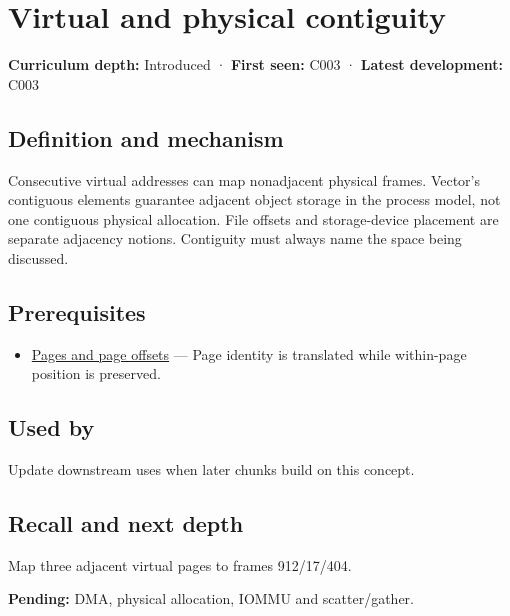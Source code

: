 \hypertarget{appendix-f897c1ddac8f}{}\label{referencestart:appendix-f897c1ddac8f}
\section{Virtual and physical contiguity}\label{appendix-f897c1ddac8f-virtual-and-physical-contiguity}

\textbf{Curriculum depth:} Introduced · \textbf{First seen:} C003 · \textbf{Latest development:} C003

\subsection{Definition and mechanism}\label{appendix-f897c1ddac8f-definition-and-mechanism}

Consecutive virtual addresses can map nonadjacent physical frames. Vector's contiguous elements guarantee adjacent object storage in the process model, not one contiguous physical allocation. File offsets and storage-device placement are separate adjacency notions. Contiguity must always name the space being discussed.

\subsection{Prerequisites}\label{appendix-f897c1ddac8f-prerequisites}

\begin{itemize}
\tightlist
\item
  \hyperref[appendix-0c67cd5bf30a]{Pages and page offsets} --- Page identity is translated while within-page position is preserved.
\end{itemize}

\subsection{Used by}\label{appendix-f897c1ddac8f-used-by}

Update downstream uses when later chunks build on this concept.

\subsection{Recall and next depth}\label{appendix-f897c1ddac8f-recall-and-next-depth}

Map three adjacent virtual pages to frames 912/17/404.

\textbf{Pending:} DMA, physical allocation, IOMMU and scatter/gather.

